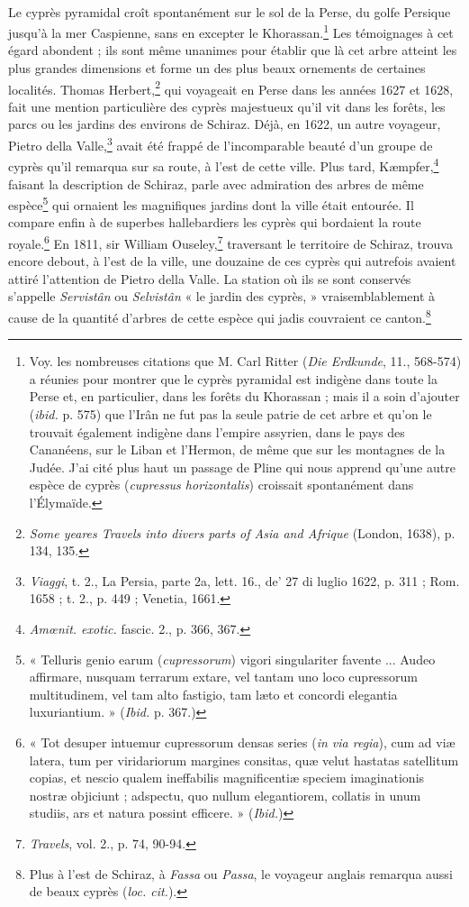\documentclass{article}
\begin{document}
\paragraph{}
Le cyprès pyramidal croît spontanément sur le sol de la Perse, du golfe Persique jusqu'à la mer Caspienne, sans en excepter le Khorassan.\footnote{Voy. les nombreuses citations que M. Carl Ritter (\emph{Die Erdkunde}, 11., 568-574) a réunies pour montrer que le cyprès pyramidal est indigène dans toute la Perse et, en particulier, dans les forêts du Khorassan ; mais il a soin d'ajouter (\emph{ibid.} p. 575) que l'Irân ne fut pas la seule patrie de cet arbre et qu'on le trouvait également indigène dans l'empire assyrien, dans le pays des Cananéens, sur le Liban et l'Hermon, de même que sur les montagnes de la Judée. J'ai cité plus haut un passage de Pline qui nous apprend qu'une autre espèce de cyprès (\emph{cupressus horizontalis}) croissait spontanément dans l'Élymaïde.} Les témoignages à cet égard abondent ; ils sont même unanimes pour établir que là cet arbre atteint les plus grandes dimensions et forme un des plus beaux ornements de certaines localités. Thomas Herbert,\footnote{\emph{Some yeares Travels into divers parts of Asia and Afrique} (London, 1638), p. 134, 135.} qui voyageait en Perse dans les années 1627 et 1628, fait une mention particulière des cyprès majestueux qu'il vit dans les forêts, les parcs ou les jardins des environs de Schiraz. Déjà, en 1622, un autre voyageur, Pietro della Valle,\footnote{\emph{Viaggi}, t. 2., La Persia, parte 2a, lett. 16., de' 27 di luglio 1622, p. 311 ; Rom. 1658 ; t. 2., p. 449 ; Venetia, 1661.} avait été frappé de l'incomparable beauté d'un groupe de cyprès qu'il remarqua sur sa route, à l'est de cette ville. Plus tard, Kæmpfer,\footnote{\emph{Amœnit. exotic.} fascic. 2., p. 366, 367.} faisant la description de Schiraz, parle avec admiration des arbres de même espèce\footnote{« Telluris genio earum (\emph{cupressorum}) vigori singulariter favente ... Audeo affirmare, nusquam terrarum extare, vel tantam uno loco cupressorum multitudinem, vel tam alto fastigio, tam læto et concordi elegantia luxuriantium. » (\emph{Ibid.} p. 367.)} qui ornaient les magnifiques jardins dont la ville était entourée. Il compare enfin à de superbes hallebardiers les cyprès qui bordaient la route royale.\footnote{« Tot desuper intuemur cupressorum densas series (\emph{in via regia}), cum ad viæ latera, tum per viridariorum margines consitas, quæ velut hastatas satellitum copias, et nescio qualem ineffabilis magnificentiæ speciem imaginationis nostræ objiciunt ; adspectu, quo nullum elegantiorem, collatis in unum studiis, ars et natura possint efficere. » (\emph{Ibid.})} En 1811, sir William Ouseley,\footnote{\emph{Travels}, vol. 2., p. 74, 90-94.} traversant le territoire de Schiraz, trouva encore debout, à l'est de la ville, une douzaine de ces cyprès qui autrefois avaient attiré l'attention de Pietro della Valle. La station où ils se sont conservés s'appelle \emph{Servistân} ou \emph{Selvistân} « le jardin des cyprès, » vraisemblablement à cause de la quantité d'arbres de cette espèce qui jadis couvraient ce canton.\footnote{Plus à l'est de Schiraz, à \emph{Fassa} ou \emph{Passa}, le voyageur anglais remarqua aussi de beaux cyprès (\emph{loc. cit.}).}
\end{document}
